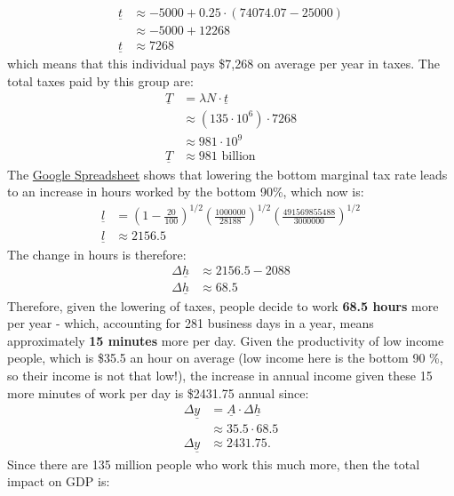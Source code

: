 \documentclass[]{book}
\begin{document}
\begin{enumerate}
\[\begin{aligned}
  \underline{t} &\approx -5000+0.25 \cdot (74074.07-25000)\\
  &\approx -5000 + 12268 \\
  \underline{t}&\approx 7268
  \end{aligned}
  \] which means that this individual pays \$7,268 on average per year
  in taxes. The total taxes paid by this group are: \[
  \begin{aligned}
  \underline{T} &= \lambda N \cdot \underline{t}\\
  &\approx (135 \cdot 10^6) \cdot 7268\\
  &\approx 981 \cdot 10^9\\
  \underline{T} &\approx 981 \text{ billion}
  \end{aligned}
  \] The
  \href{https://docs.google.com/spreadsheets/d/1faC3VTuXmo7wo4njkO2ERytzlJmbMgcckVj9ag_Mn6s/edit?usp=sharing}{Google
  Spreadsheet} shows that lowering the bottom marginal tax rate leads to
  an increase in hours worked by the bottom 90\%, which now is: \[
  \begin{aligned}
  \underline{l}&=\left(1-\frac{20}{100}\right)^{1/2}\left(\frac{1000000}{28188}\right)^{1/2}\left(\frac{491569855488}{3000000}\right)^{1/2}\\
  \underline{l}&\approx 2156.5
  \end{aligned}
  \] The change in hours is therefore: \[
  \begin{aligned}
  \Delta \underline{h} &\approx 2156.5 - 2088\\
  \Delta \underline{h} &\approx 68.5
  \end{aligned}
  \] Therefore, given the lowering of taxes, people decide to work
  \textbf{68.5 hours} more per year - which, accounting for 281 business
  days in a year, means approximately \textbf{15 minutes} more per day.
  Given the productivity of low income people, which is \$35.5 an hour
  on average (low income here is the bottom 90 \%, so their income is
  not that low!), the increase in annual income given these 15 more
  minutes of work per day is \$2431.75 annual since: \[
  \begin{aligned}
  \Delta \underline{y} &=  \underline{A} \cdot \Delta \underline{h}\\
  &\approx 35.5 \cdot 68.5\\
  \Delta \underline{y} &\approx 2431.75.
  \end{aligned}
  \] Since there are 135 million people who work this much more, then
  the total impact on GDP is: \[
  \begin{aligned}

\end{aligned}\]
\end{enumerate}
\end{document}
